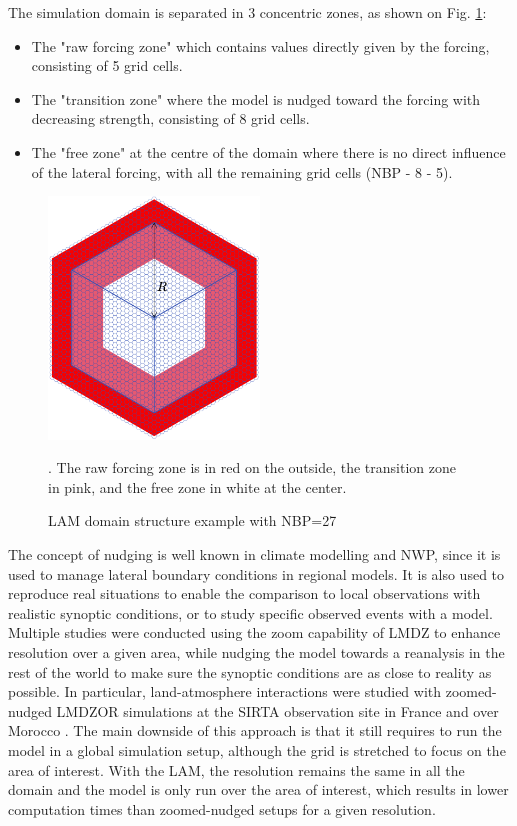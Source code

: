 \hfill

The simulation domain is separated in 3 concentric zones, as shown on Fig. \ref{fig:LAM_domain}: 
\begin{itemize}
    \item The "raw forcing zone" which contains values directly given by the forcing, consisting of 5 grid cells.
    \item The "transition zone"  where the model is nudged toward the forcing with decreasing strength, consisting of 8 grid cells.
    \item The "free zone" at the centre of the domain where there is no direct influence of the lateral forcing, with all the remaining grid cells (NBP - 8 - 5).
\end{itemize} 

\begin{figure}[ht]
    \centering
    \includegraphics[width=0.5\textwidth]{images/methods/LAM_domain_zones.png}
    \caption{LAM domain structure example with NBP=27 \citep[from][]{raillard_leveraging_2024}}. The raw forcing zone is in red on the outside, the transition zone in pink, and the free zone in white at the center.
    \label{fig:LAM_domain}
\end{figure}

The concept of nudging is well known in climate modelling and NWP, since it is used to manage lateral boundary conditions in regional models. It is also used to reproduce real situations to enable the comparison to local observations with realistic synoptic conditions, or to study specific observed events with a model. 
Multiple studies were conducted using the zoom capability of LMDZ to enhance resolution over a given area, while nudging the model towards a reanalysis in the rest of the world to make sure the synoptic conditions are as close to reality as possible. In particular, land-atmosphere interactions were studied with zoomed-nudged LMDZOR simulations at the SIRTA observation site in France \citep{cheruy_combined_2013, campoy_response_2013} and over Morocco \citep{balhane_global_2022, arjdal_modeling_2024}. The main downside of this approach is that it still requires to run the model in a global simulation setup, although the grid is stretched to focus on the area of interest. With the LAM, the resolution remains the same in all the domain and the model is only run over the area of interest, which results in lower computation times than zoomed-nudged setups for a given resolution.

